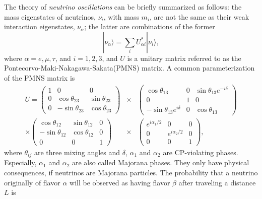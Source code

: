 The theory of \emph{neutrino oscillations} can be briefly summarized as follows: the mass eigenstates of neutrinos, $\nu_{i}$, with mass $m_{i}$, are not the same as their weak interaction eigenstates, $\nu_{\alpha}$; the latter are combinations of the former
\begin{equation}
  \label{eq:osci}
  |\nu_{\alpha}\rangle=\sum_{i}U^{*}_{\alpha i}|\nu_{i}\rangle,
\end{equation}
where $\alpha=e,\mu,\tau$, and $i=1,2,3$, and $U$ is a unitary matrix referred to as the Pontecorvo-Maki-Nakagawa-Sakata(PMNS) matrix. A common parameterization of the PMNS matrix is
\begin{equation}
  \label{eq:pmns}
  \begin{array}{rcl}
    U = \left(\begin{array}{ccc}
        1 & 0 & 0 \\ 0 & \cos\theta_{23} & \sin\theta_{23} \\ 0 &         -\sin\theta_{23} & \cos\theta_{23}
      \end{array}\right) &\times&
    \left(\begin{array}{ccc}
        \cos\theta_{13} & 0 & \sin\theta_{13}e^{-i\delta} \\ 
        0 & 1 & 0 \\ -\sin\theta_{13}e^{i\delta} & 0 & \cos\theta_{13}
      \end{array}\right) \\ \times
    \left(\begin{array}{ccc}
        \cos\theta_{12} & \sin\theta_{12} & 0 \\ -\sin\theta_{12} &         \cos\theta_{12} & 0 \\ 0 & 0 & 1
      \end{array}\right) &\times&
    \left(\begin{array}{ccc}
        e^{i\alpha_1/2} & 0 & 0 \\ 0 & e^{i\alpha_2/2} & 0 \\ 0 & 0 & 1
      \end{array}\right),
  \end{array}
\end{equation}
where $\theta_{ij}$ are three mixing angles and $\delta$, $\alpha_1$ and $\alpha_2$ are CP-violating phases. Especially, $\alpha_1$ and $\alpha_2$ are also called Majorana phases. They only have physical consequences, if neutrinos are Majorana particles. The probability that a neutrino originally of flavor $\alpha$ will be observed as having flavor $\beta$ after traveling a distance $L$ is
